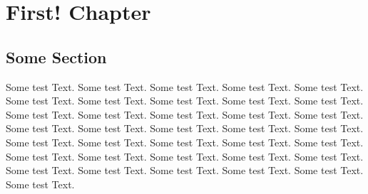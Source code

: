 \chapter{First! Chapter}
\section{Some Section}
Some test Text. Some test Text. Some test Text. Some test Text. Some test Text. Some test Text. Some test Text. Some test Text. Some test Text. Some test Text. Some test Text. Some test Text. Some test Text. Some test Text. Some test Text. Some test Text. Some test Text. Some test Text. Some test Text. Some test Text. Some test Text. Some test Text. Some test Text. Some test Text. Some test Text. Some test Text. Some test Text. Some test Text. Some test Text. Some test Text. Some test Text. Some test Text. Some test Text. Some test Text. Some test Text. Some test Text. \cite{Kay1993}